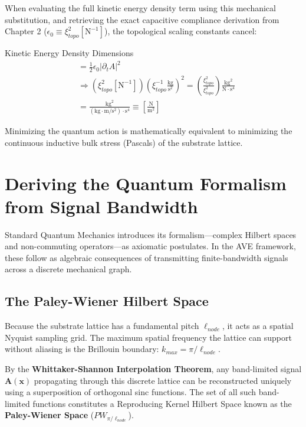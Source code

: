 When evaluating the full kinetic energy density term using this mechanical substitution,
and retrieving the exact capacitive compliance derivation from Chapter 2 ($\epsilon_{0}\equiv\xi_{topo}^2[\text{N}^{-1}]$),
the topological scaling constants cancel:

\begin{resultbox}{Kinetic Energy Density Dimensions}
\begin{align}
[\mathcal{L}_{kin}] &= \frac{1}{2}\epsilon_{0}|\partial_{t}A|^{2} \nonumber \\
&\Rightarrow (\xi_{topo}^{2}[\text{N}^{-1}])\left(\xi_{topo}^{-1}\frac{\text{kg}}{\text{s}^2}\right)^{2} = \left(\frac{\xi_{topo}^{2}}{\xi_{topo}^{2}}\right)\frac{\text{kg}^{2}}{\text{N}\cdot \text{s}^{4}} \nonumber \\
&= \frac{\text{kg}^{2}}{(\text{kg}\cdot \text{m}/\text{s}^{2})\cdot \text{s}^{4}} \equiv \left[\frac{\text{N}}{\text{m}^{2}}\right]
\end{align}
\end{resultbox}

Minimizing the quantum action is mathematically equivalent to minimizing the continuous
inductive bulk stress (Pascals) of the substrate lattice.

\section{Deriving the Quantum Formalism from Signal Bandwidth}
Standard Quantum Mechanics introduces its formalism---complex Hilbert spaces and non-commuting operators---as axiomatic postulates\cite{feynman1964}. In the AVE framework, these follow as algebraic consequences of transmitting finite-bandwidth signals across a discrete mechanical graph.

\subsection{The Paley-Wiener Hilbert Space}
Because the substrate lattice has a fundamental pitch $\ell_{node}$, it acts as a spatial Nyquist sampling grid\cite{nyquist1928}. The maximum spatial frequency the lattice can support without aliasing is the Brillouin boundary: $k_{max} = \pi / \ell_{node}$.

By the \textbf{Whittaker-Shannon Interpolation Theorem}, any band-limited signal $\mathbf{A}(\mathbf{x})$ propagating through this discrete lattice can be reconstructed uniquely using a superposition of orthogonal sinc functions\cite{shannon1949}. The set of all such band-limited functions constitutes a Reproducing Kernel Hilbert Space known as the \textbf{Paley-Wiener Space} ($PW_{\pi/\ell_{node}}$).

